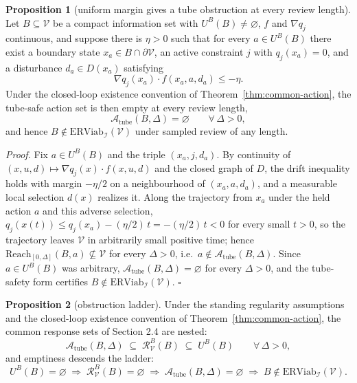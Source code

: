 \documentclass[11pt]{article}
\theoremstyle{definition}
\newtheorem{proposition}{Proposition}
\begin{document}
\begin{proposition}[uniform margin gives a tube obstruction at every review length]\label{prop:uniform-margin}
Let \(B\subseteq\mathcal V\) be a compact information set with
\(U^B(B)\neq\varnothing\), \(f\) and \(\nabla q_j\) continuous, and
suppose there is \(\eta>0\) such that for every \(a\in U^B(B)\) there
exist a boundary state \(x_a\in B\cap\partial\mathcal V\), an active
constraint \(j\) with \(q_j(x_a)=0\), and a disturbance \(d_a\in D(x_a)\)
satisfying
\[\nabla q_j(x_a)\cdot f(x_a,a,d_a) \le -\eta.\]
Under the closed-loop existence convention of
Theorem~\ref{thm:common-action}, the tube-safe action set is then empty
at every review length,
\[\mathcal{A}_{\mathrm{tube}}(B,\Delta)=\varnothing \qquad \forall\,\Delta>0,\]
and hence \(B\notin\mathrm{ERViab}_{\mathcal I}(\mathcal V)\) under
sampled review of any length.
\end{proposition}

\emph{Proof.} Fix \(a\in U^B(B)\) and the triple \((x_a,j,d_a)\). By
continuity of \((x,u,d)\mapsto\nabla q_j(x)\cdot f(x,u,d)\) and the closed
graph of \(D\), the drift inequality holds with margin \(-\eta/2\) on a
neighbourhood of \((x_a,a,d_a)\), and a measurable local selection
\(d(x)\) realizes it. Along the trajectory from \(x_a\) under the held
action \(a\) and this adverse selection,
\(q_j(x(t))\le q_j(x_a)-(\eta/2)\,t=-(\eta/2)\,t<0\) for every small
\(t>0\), so the trajectory leaves \(\mathcal V\) in arbitrarily small
positive time; hence \(\mathrm{Reach}_{[0,\Delta]}(B,a)\not\subseteq\mathcal V\)
for every \(\Delta>0\), i.e.\ \(a\notin\mathcal{A}_{\mathrm{tube}}(B,\Delta)\).
Since \(a\in U^B(B)\) was arbitrary,
\(\mathcal{A}_{\mathrm{tube}}(B,\Delta)=\varnothing\) for every
\(\Delta>0\), and the tube-safety form certifies
\(B\notin\mathrm{ERViab}_{\mathcal I}(\mathcal V)\). \ensuremath{\square}

\begin{proposition}[obstruction ladder]\label{prop:ladder}
Under the standing regularity assumptions and the closed-loop existence
convention of Theorem~\ref{thm:common-action}, the common response sets
of Section 2.4 are nested:
\[\mathcal{A}_{\mathrm{tube}}(B,\Delta) \;\subseteq\; \mathcal{R}_{\mathcal{V}}^B(B) \;\subseteq\; U^B(B) \qquad \forall\,\Delta>0,\]
and emptiness descends the ladder:
\[U^B(B)=\varnothing \;\Longrightarrow\; \mathcal{R}_{\mathcal{V}}^B(B)=\varnothing \;\Longrightarrow\; \mathcal{A}_{\mathrm{tube}}(B,\Delta)=\varnothing \;\Longrightarrow\; B\notin\mathrm{ERViab}_{\mathcal{I}}(\mathcal{V}).\]
\end{proposition}
\end{document}
